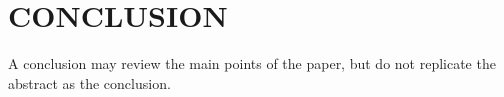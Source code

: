 \documentclass[10pt,twocolumn]{witseiepaper}
\begin{document}






%







%





%







%


%
\section{CONCLUSION}

A conclusion may review the main points of the paper, but do not replicate the
abstract as the conclusion.




%



\end{document}
